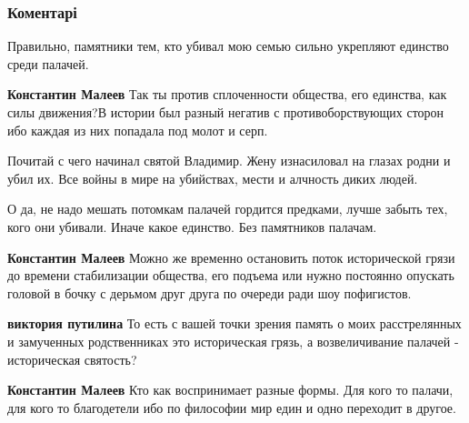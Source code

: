  
 
 
 
 
\subsubsection{Коментарі}

\begin{itemize} %
Правильно, памятники тем, кто убивал мою семью сильно укрепляют единство среди палачей.

\begin{itemize} %
\textbf{Константин Малеев} Так ты против сплоченности общества, его единства, как силы движения?В истории был разный негатив с противоборствующих сторон ибо каждая из них попадала под молот и серп.

Почитай с чего начинал святой Владимир. Жену изнасиловал на глазах родни и убил их. Все войны в мире на убийствах, мести и алчность диких людей.

О да, не надо мешать потомкам палачей гордится предками, лучше забыть тех, кого они убивали. Иначе какое единство. Без памятников палачам.

\textbf{Константин Малеев} Можно же временно остановить поток исторической грязи до времени стабилизации общества, его подъема или нужно постоянно опускать головой в бочку с дерьмом друг друга по очереди ради шоу пофигистов.

\textbf{виктория путилина} То есть с вашей точки зрения память о моих расстрелянных и замученных родственниках это историческая грязь, а возвеличивание палачей - историческая святость?

\textbf{Константин Малеев} Кто как воспринимает разные формы. Для кого то палачи, для кого то благодетели ибо по философии мир един и одно переходит в другое.
\end{itemize} %

\end{itemize} %
